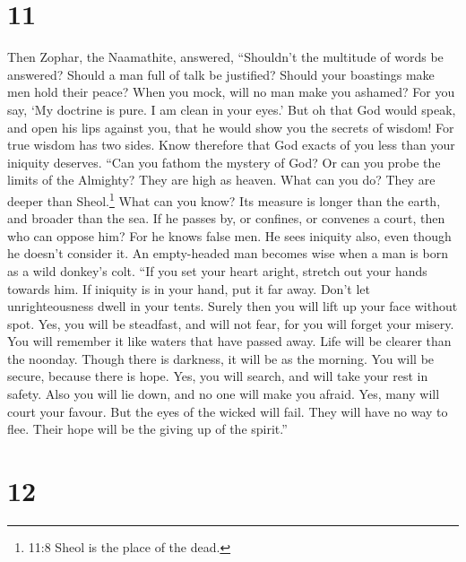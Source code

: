 \hypertarget{section-9}{%
\section{11}\label{section-9}}

 Then Zophar, the Naamathite, answered, 
``Shouldn't the multitude of words be answered? Should a man full of
talk be justified?  Should your boastings make men hold
their peace? When you mock, will no man make you ashamed? 
For you say, `My doctrine is pure. I am clean in your eyes.'
 But oh that God would speak, and open his lips against you,
 that he would show you the secrets of wisdom! For true
wisdom has two sides. Know therefore that God exacts of you less than
your iniquity deserves.  ``Can you fathom the mystery of
God? Or can you probe the limits of the Almighty?  They are
high as heaven. What can you do? They are deeper than Sheol.\footnote{11:8
  Sheol is the place of the dead.} What can you know?  Its
measure is longer than the earth, and broader than the sea.
 If he passes by, or confines, or convenes a court, then
who can oppose him?  For he knows false men. He sees
iniquity also, even though he doesn't consider it.  An
empty-headed man becomes wise when a man is born as a wild donkey's
colt.  ``If you set your heart aright, stretch out your
hands towards him.  If iniquity is in your hand, put it far
away. Don't let unrighteousness dwell in your tents. 
Surely then you will lift up your face without spot. Yes, you will be
steadfast, and will not fear,  for you will forget your
misery. You will remember it like waters that have passed away.
 Life will be clearer than the noonday. Though there is
darkness, it will be as the morning.  You will be secure,
because there is hope. Yes, you will search, and will take your rest in
safety.  Also you will lie down, and no one will make you
afraid. Yes, many will court your favour.  But the eyes of
the wicked will fail. They will have no way to flee. Their hope will be
the giving up of the spirit.''

\hypertarget{section-10}{%
\section{12}\label{section-10}}

